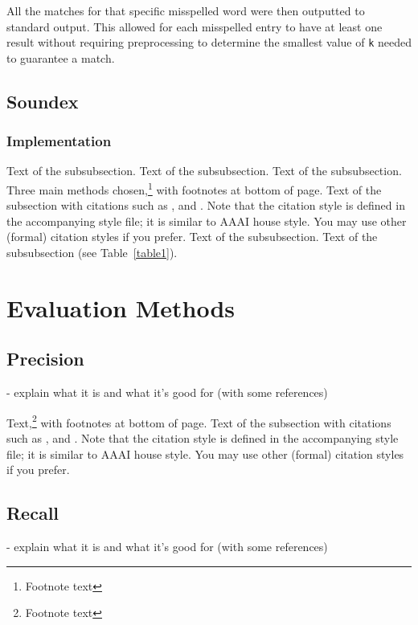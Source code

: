 \documentclass[11pt]{article}
\begin{document}
All the matches for that specific misspelled word were then outputted to standard output. This allowed for each misspelled entry to have at least one result without requiring preprocessing to determine the smallest value of \texttt{k} needed to guarantee a match.



\subsection{Soundex}



\subsubsection{Implementation}

Text of the subsubsection.
Text of the subsubsection.
Text of the subsubsection.
Three main methods chosen,\footnote{Footnote text} with footnotes at bottom of page.
Text of the subsection with citations such as 
,  and .
Note that the citation style is defined in the accompanying
style file; it is similar to AAAI house style. You may use
other (formal) citation styles if you prefer.
Text of the subsubsection.
Text of the subsubsection (see Table~\ref{table1}).



\section{Evaluation Methods}

\subsection{Precision}

- explain what it is and what it's good for (with some references)

Text,\footnote{Footnote text} with footnotes at bottom of page.
Text of the subsection with citations such as 
,  and .
Note that the citation style is defined in the accompanying
style file; it is similar to AAAI house style. You may use
other (formal) citation styles if you prefer.


\subsection{Recall}

- explain what it is and what it's good for (with some references)
\end{document}
